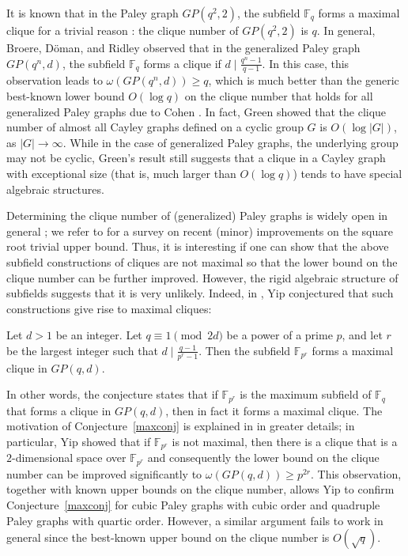 \documentclass[Unicode,ALCO,published]{cedram}
\newcommand{\F}{\mathbb{F}}
\begin{document}
It is known that in the Paley graph $GP(q^2,2)$, the subfield $\F_q$ forms a maximal clique for a trivial reason \cite{BDR}: the clique number of $GP(q^2,2)$ is $q$. In general, Broere,  D\"{o}man, and Ridley \cite{BDR} observed that in the generalized Paley graph $GP(q^n,d)$, the subfield $\F_q$ forms a clique if $d \mid \frac{q^n-1}{q-1}$. In this case, this observation leads to  $\omega(GP(q^n,d)) \geq q$, which is much better than the generic best-known lower bound $O(\log q)$ on the clique number that holds for all generalized Paley graphs due to Cohen \cite{SC}. In fact, 
Green \cite{Green} showed that the clique number of almost all Cayley graphs defined on a cyclic group $G$ is $O(\log |G|)$, as $|G| \to \infty$. While in the case of generalized Paley graphs, the underlying group may not be cyclic, Green's result still suggests that a clique in a Cayley graph with exceptional size (that is, much larger than $O(\log q)$) tends to have special algebraic structures. 

Determining the clique number of (generalized) Paley graphs is widely open in general \cite{CL}; we refer to \cite[Section 1.3] {YipG} for a survey on recent (minor) improvements on the square root trivial upper bound. Thus, it is interesting if one can show that the above subfield constructions of cliques are not maximal so that the lower bound on the clique number can be further improved. However, the rigid algebraic structure of subfields suggests that it is very unlikely. Indeed, in \cite[Conjecture 1.4]{Y22}, Yip conjectured that such constructions give rise to maximal cliques:

\begin{conj}[{\cite[Conjecture 1.4]{Y22}}]\label{maxconj}
Let $d>1$ be an integer. Let $q \equiv 1 \pmod {2d}$ be a power of a prime $p$, and let $r$ be the largest integer such that $d \mid \frac{q-1}{p^r-1}$. Then the subfield $\F_{p^r}$ forms a maximal clique in $GP(q,d)$.
\end{conj}

In other words, the conjecture states that if $\F_{p^r}$ is the maximum subfield of $\F_q$ that forms a clique in $GP(q,d)$, then in fact it forms a maximal clique. The motivation of Conjecture~\ref{maxconj} is explained in \cite{Y22} in greater details; in particular, Yip \cite[Section 3]{Y22} showed that if $\F_{p^r}$ is not maximal, then there is a clique that is a $2$-dimensional space over $\F_{p^r}$ and consequently the lower bound on the clique number can be improved significantly to $\omega(GP(q,d)) \geq p^{2r}$. This observation, together with known upper bounds on the clique number, allows Yip \cite[Theorem 1.5 and Theorem 1.6]{Y22} to confirm Conjecture~\ref{maxconj} for cubic Paley graphs with cubic order and quadruple Paley graphs with quartic order. However, a similar argument fails to work in general since the best-known upper bound on the clique number is $O(\sqrt{q})$.
\end{document}
